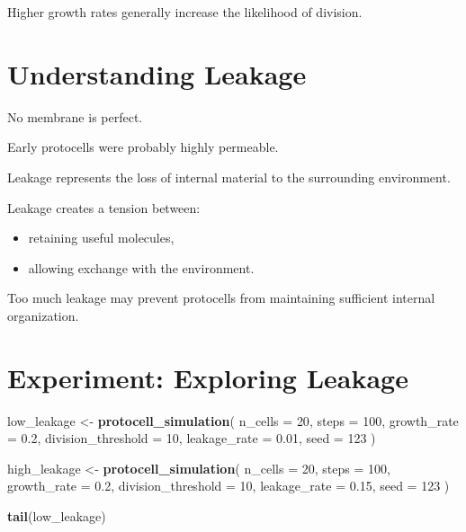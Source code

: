 \documentclass[
  oneside,
  openany]{book}
\newenvironment{Shaded}{\begin{snugshade}}{\end{snugshade}}
\newcommand{\AttributeTok}[1]{\textcolor[rgb]{0.13,0.29,0.53}{#1}}
\newcommand{\DecValTok}[1]{\textcolor[rgb]{0.00,0.00,0.81}{#1}}
\newcommand{\FloatTok}[1]{\textcolor[rgb]{0.00,0.00,0.81}{#1}}
\newcommand{\FunctionTok}[1]{\textcolor[rgb]{0.13,0.29,0.53}{\textbf{#1}}}
\newcommand{\NormalTok}[1]{#1}
\newcommand{\OtherTok}[1]{\textcolor[rgb]{0.56,0.35,0.01}{#1}}
\providecommand{\tightlist}{%
  \setlength{\itemsep}{0pt}\setlength{\parskip}{0pt}}
\begin{document}
Higher growth rates generally increase the likelihood of division.

\section{Understanding Leakage}\label{understanding-leakage}

No membrane is perfect.

Early protocells were probably highly permeable.

Leakage represents the loss of internal material to the surrounding environment.

Leakage creates a tension between:

\begin{itemize}
\tightlist
\item
  retaining useful molecules,
\item
  allowing exchange with the environment.
\end{itemize}

Too much leakage may prevent protocells from maintaining sufficient internal organization.

\section{Experiment: Exploring Leakage}\label{experiment-exploring-leakage}

\begin{Shaded}
\begin{Highlighting}[]
\NormalTok{low\_leakage }\OtherTok{\textless{}{-}} \FunctionTok{protocell\_simulation}\NormalTok{(}
  \AttributeTok{n\_cells =} \DecValTok{20}\NormalTok{,}
  \AttributeTok{steps =} \DecValTok{100}\NormalTok{,}
  \AttributeTok{growth\_rate =} \FloatTok{0.2}\NormalTok{,}
  \AttributeTok{division\_threshold =} \DecValTok{10}\NormalTok{,}
  \AttributeTok{leakage\_rate =} \FloatTok{0.01}\NormalTok{,}
  \AttributeTok{seed =} \DecValTok{123}
\NormalTok{)}

\NormalTok{high\_leakage }\OtherTok{\textless{}{-}} \FunctionTok{protocell\_simulation}\NormalTok{(}
  \AttributeTok{n\_cells =} \DecValTok{20}\NormalTok{,}
  \AttributeTok{steps =} \DecValTok{100}\NormalTok{,}
  \AttributeTok{growth\_rate =} \FloatTok{0.2}\NormalTok{,}
  \AttributeTok{division\_threshold =} \DecValTok{10}\NormalTok{,}
  \AttributeTok{leakage\_rate =} \FloatTok{0.15}\NormalTok{,}
  \AttributeTok{seed =} \DecValTok{123}
\NormalTok{)}

\FunctionTok{tail}\NormalTok{(low\_leakage)}
\end{Highlighting}
\end{Shaded}
\end{document}
